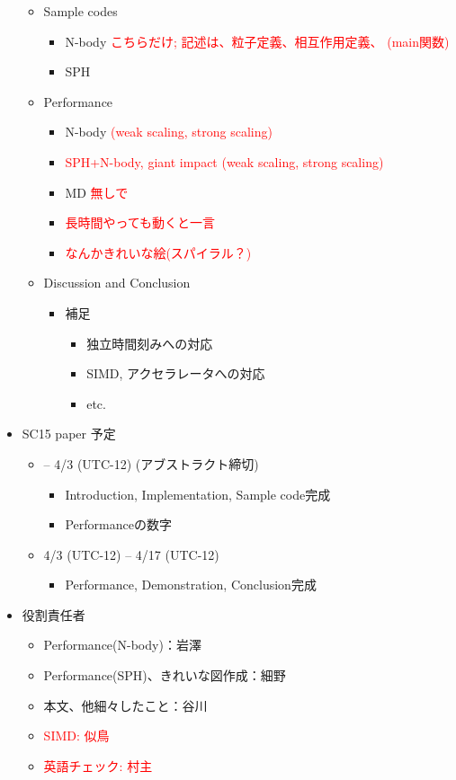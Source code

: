 \documentclass[12pt,a4paper]{jarticle}
\newcommand{\redtext}[1]{\textcolor{red}{#1}}
\begin{document}
\begin{itemize}
\begin{itemize}
\begin{itemize}
\begin{itemize}
      \end{itemize}
    \end{itemize}
  \item Sample codes
    \begin{itemize}
    \item N-body \redtext{こちらだけ; 記述は、粒子定義、相互作用定義、
      (main関数)}
    \item SPH
    \end{itemize}
  \item Performance
    \begin{itemize}
    \item N-body \redtext{(weak scaling, strong scaling)}
    \item \redtext{SPH+N-body, giant impact (weak scaling, strong
      scaling)}
    \item MD \redtext{無しで}
    \item \redtext{長時間やっても動くと一言}
    \item \redtext{なんかきれいな絵(スパイラル？)}
    \end{itemize}
  \item Discussion and Conclusion
    \begin{itemize}
    \item 補足
      \begin{itemize}
      \item 独立時間刻みへの対応
      \item SIMD, アクセラレータへの対応
      \item etc.
      \end{itemize}      
    \end{itemize}      
  \end{itemize}
\item SC15 paper 予定
  \begin{itemize}
  \item -- 4/3 (UTC-12) (アブストラクト締切)
    \begin{itemize}
    \item Introduction, Implementation, Sample code完成
    \item Performanceの数字
    \end{itemize}
  \item 4/3 (UTC-12) -- 4/17 (UTC-12)
    \begin{itemize}
    \item Performance, Demonstration, Conclusion完成
    \end{itemize}
  \end{itemize}
\item 役割責任者
  \begin{itemize}
  \item Performance(N-body)：岩澤
  \item Performance(SPH)、きれいな図作成：細野
  \item 本文、他細々したこと：谷川
  \item \redtext{SIMD: 似鳥}
  \item \redtext{英語チェック: 村主}
  \end{itemize}
\end{itemize}
\end{document}
